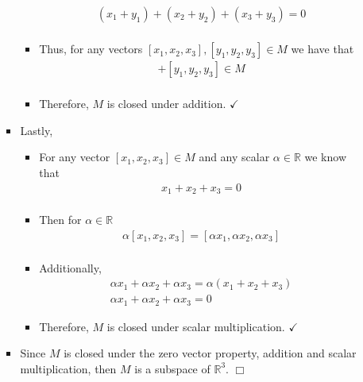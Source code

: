 \documentclass[11pt]{article}
\newcommand{\R}{\mathbb{R}}
\begin{document}
\begin{enumerate}
\begin{enumerate}
\begin{itemize}
\begin{itemize}
\begin{align*}
                (x_1 + y_1) + (x_2 + y_2) + (x_3 + y_3) = 0 \\
              \end{align*}
            \item[] Thus, for any vectors $[x_1, x_2, x_3], [y_1, y_2, y_3] \in M$ 
              we have that \begin{align*}
                [x_1, x_2, x_3] + [y_1, y_2, y_3] \in M \\
              \end{align*}
            \item[] Therefore, $M$ is closed under addition. $\checkmark$
            \end{itemize}
          \item[] Lastly,
              \begin{itemize}
                \item[] For any vector $[x_1, x_2, x_3] \in M$ and any scalar $\alpha \in \R$ we know that \begin{align*}
                    x_1 + x_2 + x_3 = 0 \\
                  \end{align*}
                \item[]Then for $\alpha \in \mathbb{R}$ \begin{align*}
                    \alpha[x_1, x_2, x_3] = [\alpha x_1, \alpha x_2, \alpha x_3] \\
                \end{align*}
                \item[] Additionally,
                  \begin{align*}
                    \alpha x_1 + \alpha x_2 + \alpha x_3 = \alpha(x_1 + x_2 + x_3) \\
                    \alpha x_1 + \alpha x_2 + \alpha x_3 = 0
                  \end{align*}
              \item[] Therefore, $M$ is closed under scalar multiplication. $\checkmark$
              \end{itemize}
          \item[] Since $M$ is closed under the zero vector property, addition 
            and scalar multiplication, then $M$ is a subspace of $\R^3$. $\Box$
      \end{itemize}
        

\end{enumerate}
\end{enumerate}
\end{document}

